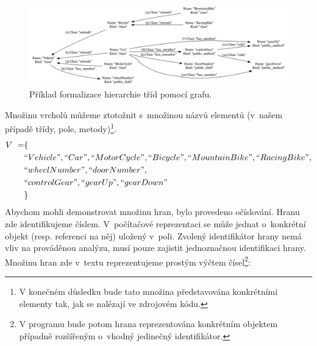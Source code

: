 \begin{figure}[h!]
  \centering
  \includegraphics[width=1.0\textwidth]{./graphs/graph_example.png}
  \caption{Příklad formalizace hierarchie tříd pomocí grafu.\label{design-graph_example}}
\end{figure}
Množinu vrcholů můžeme ztotožnit s~množinou názvů elementů (v~našem případě třídy, pole, metody)\footnote{V konečném důsledku bude tato množina představována konkrétními elementy tak, jak se nalézají ve zdrojovém kódu.}.
\begin{align*}
  V~= &\{ \\
  &``Vehicle", ``Car", ``MotorCycle", ``Bicycle", ``MountainBike", ``RacingBike", \\
  &``wheelNumber", ``doorNumber", \\
  &``controlGear", ``gearUp", ``gearDown" \\
  &\}
\end{align*}
Abychom mohli demonstrovat množinu hran, bylo provedeno očíslování. Hranu zde identifikujeme číslem. V~počítačové reprezentaci se může jednat o~konkrétní objekt (resp. referenci na něj) uložený v~poli. Zvolený identifikátor hrany nemá vliv na prováděnou analýzu, musí pouze zajistit jednoznačnou identifikaci hrany. Množinu hran zde v~textu reprezentujeme prostým výčtem čísel\footnote{V programu bude potom hrana reprezentována konkrétním objektem případně rozšířeným o~vhodný jedinečný identifikátor.}:

